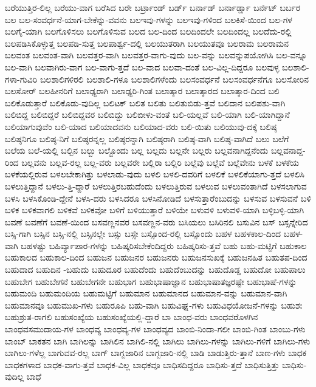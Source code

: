 {ಬರೆಯುತ್ತಿರ-ಲಿಲ್ಲ
ಬರೆಯು-ವಾಗ
ಬರೆಸಿದ
ಬರೇ
ಬರ್ಟ್ರಾಂಡ್
ಬರ್ಡ್
ಬರ್ನಾಡ್
ಬರ್ನಾರ್ಡ್ಷಾ
ಬರ್ನೆಟ್
ಬರ್ಬರ
ಬಲ
ಬಲ-ಸಂವರ್ಧನೆ-ಯಾಗ-ಬೇಕೆನ್ನು-ವವನು
ಬಲಇವು-ಗಳನ್ನು
ಬಲಇವು-ಗಳಿಂದ
ಬಲಕಿಸೆ-ಯಿಂದ
ಬಲ-ಗಳ
ಬಲಗೈ-ಯಾಗಿ
ಬಲಗೊಳಿಸಲು
ಬಲಗೊಳಿಸುವ
ಬಲದ
ಬಲ-ದಿಂದ
ಬಲದಿಂದಲೇ
ಬಲದಿಂದಲ್ಲ
ಬಲದೆದು-ರಲ್ಲಿ
ಬಲಪಡಿಸಿಕೊಳ್ಳುತ್ತ
ಬಲಪಡಿ-ಸುತ್ತ
ಬಲಪಾರ್ಶ್ವ-ದಲ್ಲಿ
ಬಲಯುತರಾಗಿ
ಬಲಯುತವೂ
ಬಲರಾಮ
ಬಲರಾಮನ
ಬಲವಂತ
ಬಲವಂತ-ವಾಗಿ
ಬಲವತ್ತರ-ವಾಗಿ
ಬಲವತ್ತರ-ವಾಗು-ವುದು
ಬಲ-ವನ್ನು
ಬಲವನ್ನುಪಯೋಗಿಸಿ
ಬಲ-ವನ್ನೂ
ಬಲ-ವಾಗಿ
ಬಲವಾಗಿರು-ವಾಗ
ಬಲ-ವಾಗು-ತ್ತದೆ
ಬಲ-ವಾದ
ಬಲವಾ-ದಂತೆ
ಬಲ-ವಿಲ್ಲ-ದಿದ್ದರೂ
ಬಲವುಳ್ಳ
ಬಲಶಾಲಿ-ಗಳಾ-ಗುವಿರಿ
ಬಲಶಾಲಿಗಳಿರಲಿ
ಬಲಶಾಲಿ-ಗಳೂ
ಬಲಶಾಲಿಗಳೆಂದು
ಬಲಸಂವರ್ಧನೆ
ಬಲಸಂವರ್ಧನೆಗೂ
ಬಲಸೋರಿನ
ಬಲಸೋರ್
ಬಲಹೀನರಿಗೆ
ಬಲಾಢ್ಯರಾಗಿ
ಬಲಾಢ್ಯರಿ-ಗಿಂತ
ಬಲಾತ್ಕಾರ
ಬಲಾತ್ಕಾರದ
ಬಲಾತ್ಕಾರ-ದಿಂದ
ಬಲಿ
ಬಲಿಕೊಡುತ್ತಾರೆ
ಬಲಿಕೊಡು-ವುದಿಲ್ಲ
ಬಲಿಟಕ್
ಬಲಿತ
ಬಲಿತು
ಬಲಿತುಬಿಡು-ತ್ತವೆ
ಬಲಿದಾನ
ಬಲಿಪಶು-ವಾಗಿ
ಬಲಿಬಿದ್ದ
ಬಲಿಬಿದ್ದರೆ
ಬಲಿಬಿದ್ದವರ
ಬಲಿಬಿದ್ದು
ಬಲಿಬೀಳು-ವಂತೆ
ಬಲಿ-ಯಲ್ಲವೆ
ಬಲಿ-ಯಾಗಿ
ಬಲಿ-ಯಾಗಿದ್ದಾನೆ
ಬಲಿಯಾಗುವುವೆಂ
ಬಲಿ-ಯಾದ
ಬಲಿಯಾದವನು
ಬಲಿಯಾದ-ವರು
ಬಲಿ-ಯಿತು
ಬಲಿಯುವು-ದಕ್ಕೆ
ಬಲಿಷ್ಠ
ಬಲಿಷ್ಠನಿಗೂ
ಬಲಿಷ್ಠ-ನಿಗೆ
ಬಲಿಷ್ಠರನ್ನಲ್ಲ
ಬಲಿಷ್ಠರನ್ನಾಗಿ
ಬಲಿಷ್ಠರಾಗಿ
ಬಲಿಷ್ಠ-ವಾಗಿ
ಬಲಿಷ್ಠ-ವಾಗಿದೆ
ಬಲು
ಬಲೆಗೆ
ಬಲೆಯ
ಬಲೆ-ಯಲ್ಲಿ
ಬಲ್ಬಿನ
ಬಲ್ಬು
ಬಲ್ಬೊಂದು
ಬಲ್ಲ
ಬಲ್ಲದು
ಬಲ್ಲನೇ
ಬಲ್ಲರು
ಬಲ್ಲವನಾಗಿದ್ದನೆಂದು
ಬಲ್ಲವನಾದ್ದ-ರಿಂದ
ಬಲ್ಲವನು
ಬಲ್ಲವ-ರಲ್ಲ
ಬಲ್ಲ-ವರು
ಬಲ್ಲವರೇ
ಬಲ್ಲಿರಾ
ಬಲ್ಲಿರಿ
ಬಲ್ಲೆವು
ಬಲ್ಲೆವೆ
ಬಲ್ಲೆವೇನು
ಬಳಕೆ
ಬಳಕೆಯ
ಬಳಕೆಯಲ್ಲಿರುವ
ಬಳಲಬೇಕಾಗಿತ್ತು
ಬಳಲಾಡು-ವುದು
ಬಳಲಿ
ಬಳಲಿ-ದವರಿಗೆ
ಬಳಲಿಕೆ
ಬಳಲಿಕೆಯಾಗು-ತ್ತದೆ
ಬಳಲಿಸಿ
ಬಳಲುತ್ತಿದ್ದಾನೆ
ಬಳಲು-ತ್ತಿ-ದ್ದಾರೆ
ಬಳಲುತ್ತಿರಬಹುದೆಂದು
ಬಳಲುತ್ತಿರುವ
ಬಳಲುವ
ಬಳಲುವಂತಾಗಿದೆ
ಬಳಸಲಾಗುವ
ಬಳಸಿ
ಬಳಸಿಕೊಂಡಿ-ದ್ದೇನೆ
ಬಳಸಿ-ದರು
ಬಳಸಿದರೂ
ಬಳಸಿನೋಡಿದೆ
ಬಳಸುತ್ತಾರೆಂಬುದನ್ನು
ಬಳಸುವ
ಬಳಸುವನೆ
ಬಳಿ
ಬಳಿಕ
ಬಳಿಕವಾಗಲಿ
ಬಳಿಕವೆ
ಬಳಿಕವೋ
ಬಳಿಗೆ
ಬಳಿಯುತ್ತಾರೆ
ಬಳಿಯೇ
ಬಳುವಳಿ
ಬಳುವಳಿ-ಯಾಗಿ
ಬಳ್ಳಿಬಳ್ಳಿ-ಯಾಗಿ
ಬವಣೆ
ಬವಣೆಗೆ
ಬವಣೆ-ಯಿಂದ
ಬಸವಣ್ಣನವರ
ಬಸವಣ್ಣನ-ವರು
ಬಸಿಯಲು
ಬಸಿರಿನಲಿ
ಬಸುವಿನ
ಬಸ್
ಬಸ್ಸನ್ನೇರಿದ
ಬಸ್ಸಿ-ಗಾಗಿ
ಬಸ್ಸಿನ
ಬಸ್ಸಿ-ನಲ್ಲಿ
ಬಸ್ಸಿನಲ್ಲೇ
ಬಸ್ಸು
ಬಸ್ಸೇ
ಬಸ್ಸೊಂದ-ರಲ್ಲಿ
ಬಸ್ಸೊಂದು
ಬಹಳ
ಬಹಳಕಾಲ-ದಿಂದ
ಬಹಳ-ವಾಗಿ
ಬಹಳಷ್ಟು
ಬಹಿರ್ವ್ಯಾಪಾರ-ಗಳನ್ನು
ಬಹಿಷ್ಕರಿಸಬೇಕೆಂದಿದ್ದರು
ಬಹಿಷ್ಕರಿಸು-ತ್ತವೆ
ಬಹು
ಬಹು-ಮಟ್ಟಿಗೆ
ಬಹುಕಾಲ
ಬಹುಕಾಲದ
ಬಹುಕಾಲ-ದಿಂದ
ಬಹುಜನ
ಬಹುಜನರ
ಬಹುಜನರು
ಬಹುಜನಸುಖಕ್ಕೆ
ಬಹುಜನಹಿತ
ಬಹುತಪ-ದಿಂದ
ಬಹುದಾದ
ಬಹುದಿನ
-ಬಹುದು
ಬಹುದೂರ
ಬಹುದೆಂದು
ಬಹುದೆಂಬುದನ್ನು
ಬಹುದೊಡ್ಡ
ಬಹುದೋ
ಬಹುಪಾಲು
ಬಹುಬೇಗ
ಬಹುಬೇಗನೆ
ಬಹುಬೇಗನೇ
ಬಹುಭಾಗ
ಬಹುಭಾಷಾಜ್ಞಾನ
ಬಹುಭಾಷಾತಜ್ಞರಷ್ಟೇ
ಬಹುಭಾಷೆ-ಗಳನ್ನು
ಬಹುಮಂದಿ
ಬಹುಮಂದಿಯ
ಬಹುಮಟ್ಟಿಗೆ
ಬಹುಮಾನ
ಬಹುಮಾನದ
ಬಹುಮಾನ-ವನ್ನು
ಬಹುಮಾನ-ವಾಗಿ
ಬಹುಮಾನವೂ
ಬಹುಮುಖ-ಗಳು
ಬಹುರೂಪಿ
ಬಹು-ವಾಗಿ
ಬಹುವಿಘ್ನ-ಗಳು
ಬಹುವಿಧಯೋಜನೆ-ಗಳನ್ನು
ಬಹುಶಃ
ಬಹುಶ್ರುತ-ರಾಗಲಿ
ಬಹುಸಂಖ್ಯೆಯ
ಬಹುಸಂಖ್ಯೆಯಲ್ಲಿ-ದ್ದಾರೆ
ಬಾ
ಬಾಂಧ-ವರು
ಬಾಂಧವರೊಳಗಿನ
ಬಾಂಧವಸಮುದಾಯ-ಗಳ
ಬಾಂಧವ್ಯ
ಬಾಂಧವ್ಯ-ಗಳ
ಬಾಂಧವ್ಯದ
ಬಾಂಬಿ-ನಿಂದಾ-ಗಲೀ
ಬಾಂಬಿ-ಗಿಂತ
ಬಾಂಬು-ಗಳು
ಬಾಂಬ್
ಬಾಕತನ
ಬಾಗಿ
ಬಾಗಿಲನ್ನು
ಬಾಗಿಲಿನ
ಬಾಗಿಲಿ-ನಲ್ಲಿ
ಬಾಗಿಲು
ಬಾಗಿಲು-ಗಳನ್ನು
ಬಾಗಿಲು-ಗಳಿಗೆ
ಬಾಗಿಲು-ಗಳು
ಬಾಗಿಲು-ಗಳೆಲ್ಲ
ಬಾಗುವವ-ರಲ್ಲ
ಬಾಗ್
ಬಾಗ್ಬಜಾರಿನ
ಬಾಗ್ಬಜಾರಿ-ನಲ್ಲಿ
ಬಾಡಿ
ಬಾಡುತ್ತಿರು-ತ್ತಾನೆ
ಬಾಣ-ಗಳು
ಬಾಧಕ
ಬಾಧಕಗಳಾದ
ಬಾಧಕ-ವಾಗು-ತ್ತವೆ
ಬಾಧಕ-ವಿಲ್ಲ
ಬಾಧಕವೂ
ಬಾಧಿಸದಿದ್ದರೂ
ಬಾಧಿಸು-ತ್ತದೆ
ಬಾಧಿಸುತ್ತಿತ್ತು
ಬಾಧಿಸು-ವುದಿಲ್ಲ
ಬಾಧೆ
}
